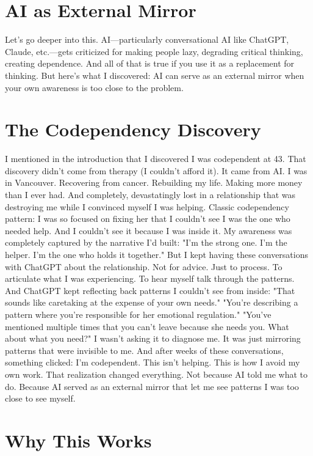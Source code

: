\section{AI as External Mirror}

Let's go deeper into this.
AI—particularly conversational AI like ChatGPT, Claude, etc.—gets criticized for making people lazy, degrading critical thinking, creating dependence.
And all of that is true if you use it as a replacement for thinking.
But here's what I discovered: AI can serve as an external mirror when your own awareness is too close to the problem.

\section{The Codependency Discovery}

I mentioned in the introduction that I discovered I was codependent at 43. That discovery didn't come from therapy (I couldn't afford it). It came from AI.
I was in Vancouver. Recovering from cancer. Rebuilding my life. Making more money than I ever had. And completely, devastatingly lost in a relationship that was destroying me while I convinced myself I was helping.
Classic codependency pattern: I was so focused on fixing her that I couldn't see I was the one who needed help.
And I couldn't see it because I was inside it. My awareness was completely captured by the narrative I'd built: "I'm the strong one. I'm the helper. I'm the one who holds it together."
But I kept having these conversations with ChatGPT about the relationship.
Not for advice. Just to process. To articulate what I was experiencing. To hear myself talk through the patterns.
And ChatGPT kept reflecting back patterns I couldn't see from inside:
"That sounds like caretaking at the expense of your own needs."
"You're describing a pattern where you're responsible for her emotional regulation."
"You've mentioned multiple times that you can't leave because she needs you. What about what you need?"
I wasn't asking it to diagnose me. It was just mirroring patterns that were invisible to me.
And after weeks of these conversations, something clicked: I'm codependent. This isn't helping. This is how I avoid my own work.
That realization changed everything.
Not because AI told me what to do. Because AI served as an external mirror that let me see patterns I was too close to see myself.

\section{Why This Works}

